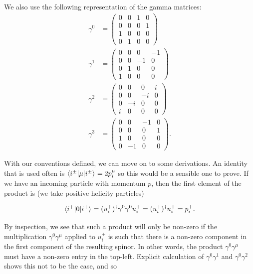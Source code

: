 We also use the following representation of the gamma matrices: %
\begin{subequations}
\begin{align}
\gamma^0 &= 
 \begin{pmatrix}
  0 & 0 & 1 & 0\\
  0 & 0 & 0 & 1\\
  1 & 0 & 0 & 0\\
  0 & 1 & 0 & 0
 \end{pmatrix}\\
 \gamma^1 &= 
 \begin{pmatrix}
  0 & 0 & 0 & -1\\
  0 & 0 & -1 & 0\\
  0 & 1 & 0 & 0\\
  1 & 0 & 0 & 0
 \end{pmatrix}\\
 \gamma^2 &= 
 \begin{pmatrix}
  0 & 0 & 0 & i\\
  0 & 0 & -i & 0\\
  0 & -i & 0 & 0\\
  i & 0 & 0 & 0
 \end{pmatrix}\\
 \gamma^3 &= 
 \begin{pmatrix}
  0 & 0 & -1 & 0\\
  0 & 0 & 0 & 1\\
  1 & 0 & 0 & 0\\
  0 & -1 & 0 & 0
 \end{pmatrix}.
 \end{align}
 \end{subequations}

With our conventions defined, we can move on to some derivations. An identity that is used often is $\mathinner{\langle i^\pm\vert\mu\vert i^\pm\rangle}_{} = 2p_i^\mu$ so this would be a sensible one to prove. If we have an incoming particle with momentum $p$, then the first element of the product is (we take positive helicity particles)

\begin{equation}
\mathinner{\langle i^+\vert0\vert i^+\rangle}_{} = (u_i^+)^\dagger \gamma^0 \gamma^0 u_i^+ =  (u_i^+)^\dagger u_i^+ = p_i^+.
\end{equation}

By inspection, we see that such a product will only be non-zero if the multiplication $\gamma^0 \gamma^\mu$ applied to $u_i^+$ is such that there is a non-zero component in the first component of the resulting spinor. In other words, the product $\gamma^0\gamma^\mu$ must have a non-zero entry in the top-left. Explicit calculation of $\gamma^0 \gamma^1$ and $\gamma^0 \gamma^2$ shows this not to be the case, and so

